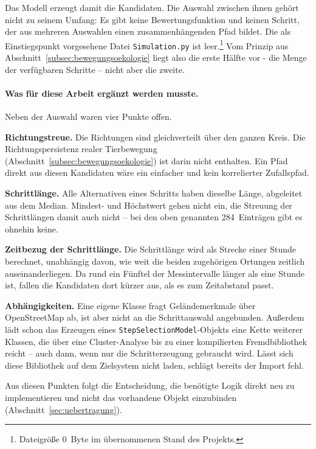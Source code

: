 \documentclass[12pt,a4paper]{report}
\begin{document}
Das Modell erzeugt damit die Kandidaten. Die Auswahl zwischen ihnen gehört nicht zu seinem
Umfang: Es gibt keine Bewertungsfunktion und keinen Schritt, der aus mehreren Auswahlen
einen zusammenhängenden Pfad bildet. Die als Einstiegspunkt vorgesehene Datei
\texttt{Simulation.py} ist leer.\footnote{Dateigröße 0~Byte im übernommenen Stand des
Projekts.} Vom Prinzip aus Abschnitt~\ref{subsec:bewegungsoekologie} liegt also die erste
Hälfte vor - die Menge der verfügbaren Schritte -- nicht aber die zweite.

\paragraph{Was für diese Arbeit ergänzt werden musste.}
\label{subsubsec:limitationen-simulation}

Neben der Auswahl waren vier Punkte offen.

\textbf{Richtungstreue.} Die Richtungen sind gleichverteilt über den ganzen Kreis. Die
Richtungspersistenz realer Tierbewegung (Abschnitt~\ref{subsec:bewegungsoekologie}) ist
darin nicht enthalten. Ein Pfad direkt aus diesen Kandidaten wäre ein einfacher und kein
korrelierter Zufallspfad.

\textbf{Schrittlänge.} Alle Alternativen eines Schritts haben dieselbe Länge, abgeleitet aus
dem Median. Mindest- und Höchstwert gehen nicht ein, die Streuung der Schrittlängen damit
auch nicht -- bei den oben genannten 284~Einträgen gibt es ohnehin keine.

\textbf{Zeitbezug der Schrittlänge.} Die Schrittlänge wird als Strecke einer Stunde
berechnet, unabhängig davon, wie weit die beiden zugehörigen Ortungen zeitlich
auseinanderliegen. Da rund ein Fünftel der Messintervalle länger als eine Stunde ist, fallen
die Kandidaten dort kürzer aus, als es zum Zeitabstand passt.

\textbf{Abhängigkeiten.} Eine eigene Klasse fragt Geländemerkmale über OpenStreetMap ab, ist
aber nicht an die Schrittauswahl angebunden. Außerdem lädt schon das Erzeugen eines
\texttt{StepSelectionModel}-Objekts eine Kette weiterer Klassen, die über eine
Cluster-Analyse bis zu einer kompilierten Fremdbibliothek reicht -- auch dann, wenn nur die
Schritterzeugung gebraucht wird. Lässt sich diese Bibliothek auf dem Zielsystem nicht laden,
schlägt bereits der Import fehl.

Aus diesen Punkten folgt die Entscheidung, die benötigte Logik direkt neu zu implementieren
und nicht das vorhandene Objekt einzubinden (Abschnitt~\ref{sec:uebertragung}).
\end{document}
